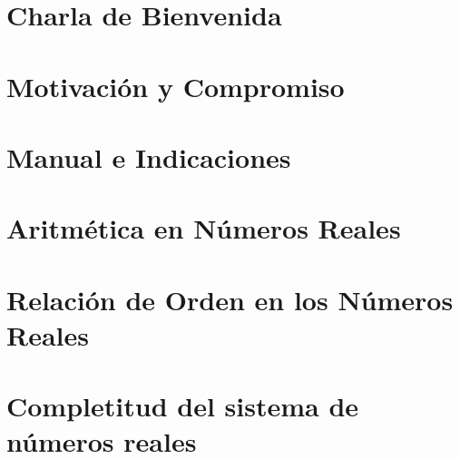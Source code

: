 \section{Charla de Bienvenida}

\section{Motivaci\'{o}n y Compromiso}

\section{Manual e Indicaciones}

\section{Aritm\'{e}tica en N\'{u}meros Reales}

\section{Relaci\'{o}n de Orden en los N\'{u}meros Reales}

\section{Completitud del sistema de n\'{u}meros reales}
